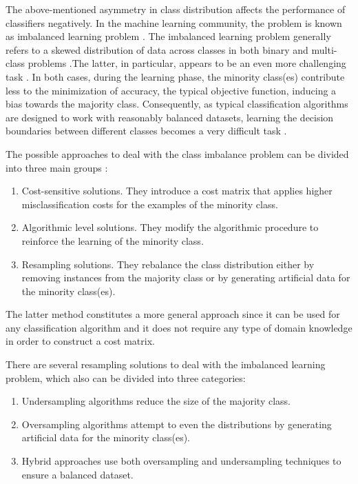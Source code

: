 \documentclass[remotesensing,article,submit,moreauthors,pdftex]{Definitions/mdpi}
\begin{document}
The above-mentioned asymmetry in class distribution affects the performance of
classifiers negatively. In the machine learning community, the problem is known
as imbalanced learning problem \cite{Chawla2004}. The imbalanced learning
problem generally refers to a skewed distribution of data across classes in
both binary and multi-class problems \cite{Abdi2016}.The latter, in particular,
appears to be an even more challenging task \cite{Garcia2018}. In both cases,
during the learning phase, the minority class(es) contribute less to the
minimization of accuracy, the typical objective function, inducing a bias
towards the majority class. Consequently, as typical classification algorithms
are designed to work with reasonably balanced datasets, learning the decision
boundaries between different classes becomes a very difficult task
\cite{Saez2016}.

The possible approaches to deal with the class imbalance problem can be divided
into three main groups \cite{Fernandez2013}:

\begin{enumerate}

	\item Cost-sensitive solutions. They introduce a cost matrix that applies
	      higher misclassification costs for the examples of the minority class.

	\item Algorithmic level solutions. They modify the algorithmic procedure to
	      reinforce the learning of the minority class.

	\item Resampling solutions. They rebalance the class distribution either by
	      removing instances from the majority class or by generating artificial
				data for the minority class(es).

\end{enumerate}

The latter method constitutes a more general approach since it can be used for
any classification algorithm and it does not require any type of domain
knowledge in order to construct a cost matrix.

There are several resampling solutions to deal with the imbalanced learning
problem, which also can be divided into three categories:

\begin{enumerate}

	\item Undersampling algorithms reduce the size of the majority class.

	\item Oversampling algorithms attempt to even the distributions by
	      generating artificial data for the minority class(es).

	\item Hybrid approaches use both oversampling and undersampling techniques
	      to ensure a balanced dataset.

\end{enumerate}
\end{document}
